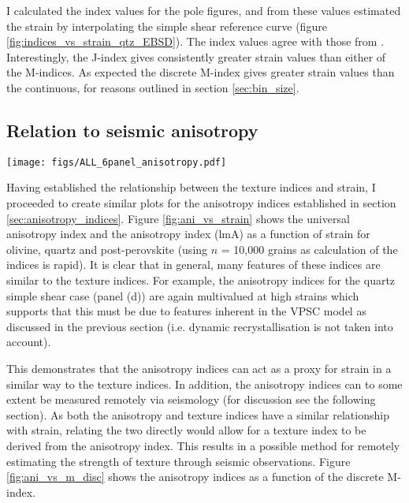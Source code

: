 \documentclass[a4paper,12pt,twoside]{report}
\numberwithin{equation}{chapter}
\begin{document}
I calculated the index values for the pole figures, and from these values estimated the strain by interpolating the simple shear reference curve (figure \ref{fig:indices_vs_strain_qtz_EBSD}). The index values agree with those from \cite{ParsonsThesis}. Interestingly, the J-index gives consistently greater strain values than either of the M-indices. As expected the discrete M-index gives greater strain values than the continuous, for reasons outlined in section \ref{sec:bin_size}.  

\subsection{Relation to seismic anisotropy}


\begin{figure*}[p]
  \centering
    \texttt{[image: figs/ALL\_6panel\_anisotropy.pdf]}
  \caption[Anisotropy measures and strain]{Seismic anisotropy measures, the Universal Elastic Anisotropy Index (uA) and the \cite{Ledbetter2006} index (lmA) against strain. \textbf{Top row} shows data from olivine VPSC models, \textbf{middle row} shows quartz, and \textbf{bottom row} shows post-perovskite. \textbf{Right column} shows data from axial compression models and \textbf{left column} shows data from simple shear models. All calculations use $n$ = 10,000 grains.} 
  \label{fig:ani_vs_strain}
\end{figure*} 

Having established the relationship between the texture indices and strain, I proceeded to create similar plots for the anisotropy indices established in section \ref{sec:anisotropy_indices}. Figure \ref{fig:ani_vs_strain} shows the universal anisotropy index \citep[uA,][]{Ranganathan2008} and the \cite{Ledbetter2006} anisotropy index (lmA) as a function of strain for olivine, quartz and post-perovskite (using $n$ = 10,000 grains as calculation of the indices is rapid). It is clear that in general, many features of these indices are similar to the texture indices. For example, the anisotropy indices for the quartz simple shear case (panel (d)) are again multivalued at high strains which supports that this must be due to features inherent in the VPSC model as discussed in the previous section (i.e. dynamic recrystallisation is not taken into account).    

This demonstrates that the anisotropy indices can act as a proxy for strain in a similar way to the texture indices. In addition, the anisotropy indices can to some extent be measured remotely via seismology (for discussion see the following section). As both the anisotropy and texture indices have a similar relationship with strain, relating the two directly would allow for a texture index to be derived from the anisotropy index. This results in a possible method for remotely estimating the strength of texture through seismic observations. Figure \ref{fig:ani_vs_m_disc} shows the anisotropy indices as a function of the discrete M-index. 
\end{document}
